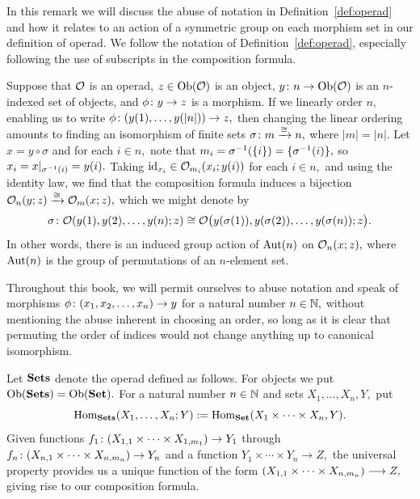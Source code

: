 \documentclass[../main/CT4S-EN-RU]{subfiles}
\begin{document}
\begin{remarkENG}\label{rem:symmetry}
In this remark we will discuss the abuse of notation in Definition~\ref{def:operad} and how it relates to an action of a symmetric group on each morphism set in our definition of operad. We follow the notation of Definition~\ref{def:operad}, especially following the use of subscripts in the composition formula.

Suppose that $\mathcal{O}$ is an operad, $z\in\operatorname{Ob}(\mathcal{O})$ is an object, $y\colon n\rightarrow\operatorname{Ob}(\mathcal{O})$ is an $n$-indexed set of objects, and $\phi\colon y\rightarrow z$ is a morphism. If we linearly order $n,$ enabling us to write $\phi\colon (y(1),\ldots,y(|n|))\rightarrow z,$ then changing the linear ordering amounts to finding an isomorphism of finite sets $\sigma\colon m\xrightarrow{\cong} n,$ where $|m|=|n|.$ Let $x=y\circ\sigma$ and for each $i\in n,$ note that $m_i=\sigma^\m1(\{i\})=\{\sigma^\m1(i)\},$ so $x_i=x|_{\sigma^\m1(i)}=y(i).$ Taking $\operatorname{id}_{x_i}\in\mathcal{O}_{m_i}(x_i;y(i))$ for each $i\in n,$ and using the identity law, we find that the composition formula induces a bijection $\mathcal{O}_n(y;z)\xrightarrow{\cong}\mathcal{O}_m(x;z),$ which we might denote by 
$$\sigma\colon\mathcal{O}(y(1),y(2),\ldots,y(n);z)\cong\mathcal{O}\big(y(\sigma(1)),y(\sigma(2)),\ldots,y(\sigma(n));z\big).$$
In other words, there is an induced group action of $\operatorname{Aut}(n)$ on $\mathcal{O}_n(x;z),$ where $\operatorname{Aut}(n)$ is the group of permutations of an $n$-element set.

Throughout this book, we will permit ourselves to abuse notation and speak of morphisms $\phi\colon (x_1,x_2,\ldots,x_n)\rightarrow y$ for a natural number $n\in{\mathbb N},$ without mentioning the abuse inherent in choosing an order, so long as it is clear that permuting the order of indices would not change anything up to canonical isomorphism.
\end{remarkENG}

\begin{remarkRUS}\label{rem:symmetry}
\end{remarkRUS}

\begin{exampleENG}
Let ${\mathbf{Sets}}$ denote the operad defined as follows. For objects we put $\operatorname{Ob}({\mathbf{Sets}})=\operatorname{Ob}({\mathbf{Set}}).$ For a natural number $n\in{\mathbb N}$ and sets $X_1,\ldots,X_n,Y,$ put 
$$\operatorname{Hom}_{\mathbf{Sets}}(X_1,\ldots,X_n;Y):=\operatorname{Hom}_{\mathbf{Set}}(X_1\times\cdots\times X_n,Y).$$
Given functions $f_1\colon(X_{1,1}\times\cdots\times X_{1,m_1})\rightarrow Y_1$ through $f_n\colon (X_{n,1}\times\cdots\times X_{n,m_n})\rightarrow Y_n$ and a function $Y_1\times\cdots\times Y_n\to Z,$ the universal property provides us a unique function of the form $(X_{1,1}\times\cdots\times X_{n,m_n})\longrightarrow Z,$ giving rise to our composition formula.
\end{exampleENG}
\end{document}
